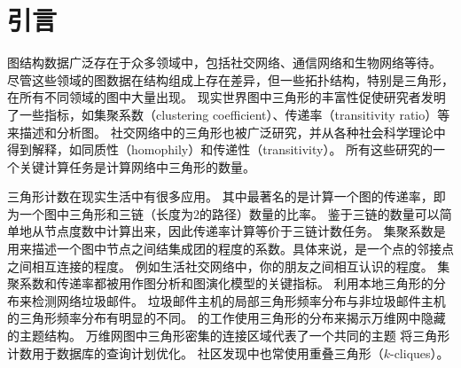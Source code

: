 



\chapter{引言}

图结构数据广泛存在于众多领域中，包括社交网络、通信网络和生物网络等待。
尽管这些领域的图数据在结构组成上存在差异，但一些拓扑结构，特别是三角形，在所有不同领域的图中大量出现。
现实世界图中三角形的丰富性促使研究者发明了一些指标，如集聚系数（clustering coefficient）\citep{watts1998collective}、传递率（transitivity ratio）\citep{holland1971transitivity}等来描述和分析图。
社交网络中的三角形也被广泛研究，并从各种社会科学理论中得到解释，如同质性（homophily）\citep{mcpherson2001birds}和传递性（transitivity）\citep{holland1971transitivity}。
所有这些研究的一个关键计算任务是计算网络中三角形的数量。

三角形计数在现实生活中有很多应用。
其中最著名的是计算一个图的传递率，即为一个图中三角形和三链（长度为2的路径）数量的比率。
鉴于三链的数量可以简单地从节点度数中计算出来，因此传递率计算等价于三链计数任务。
集聚系数是用来描述一个图中节点之间结集成团的程度的系数。具体来说，是一个点的邻接点之间相互连接的程度。
例如生活社交网络中，你的朋友之间相互认识的程度。
集聚系数和传递率都被用作图分析和图演化模型的关键指标\citep{aggarwal2014evolutionary}。
\cite{becchetti2008efficient}利用本地三角形的分布来检测网络垃圾邮件。
垃圾邮件主机的局部三角形频率分布与非垃圾邮件主机的三角形频率分布有明显的不同。
\cite{eckmann2002curvature}的工作使用三角形的分布来揭示万维网中隐藏的主题结构。
万维网图中三角形密集的连接区域代表了一个共同的主题
\cite{bar2002reductions}将三角形计数用于数据库的查询计划优化。
社区发现中也常使用重叠三角形（$k$-cliques）\citep{palla2005uncovering}。

